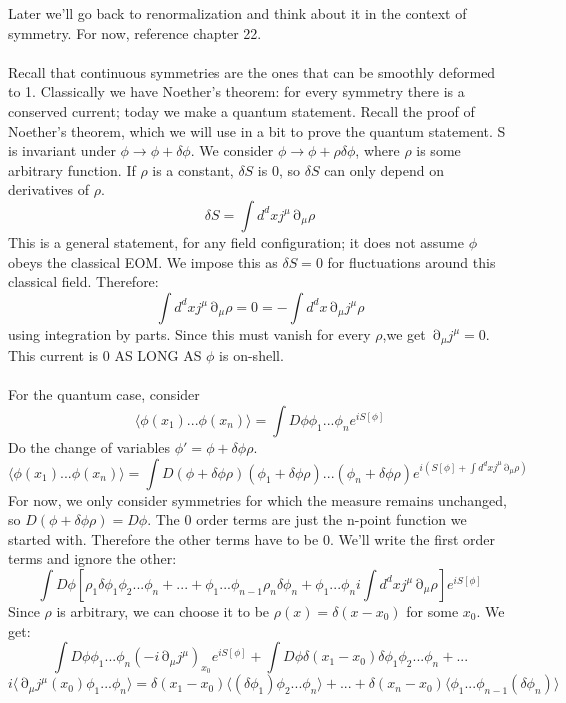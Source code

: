 \documentclass[12 pt]{article}
\DeclareMathOperator {\p} {\partial}
\begin{document}
Later we'll go back to renormalization and think about it in the context of symmetry. For now, reference chapter 22.
\\
\\
Recall that continuous symmetries are the ones that can be smoothly deformed to 1. Classically we have Noether's theorem: for every symmetry there is a conserved current; today we make a quantum statement. Recall the proof of Noether's theorem, which we will use in a bit to prove the quantum statement. S is invariant under $\phi \to \phi+\delta \phi$. We consider $\phi \to \phi + \rho \delta \phi $, where $\rho$ is some arbitrary function. If $\rho$ is a constant, $\delta S$ is 0, so $\delta S$ can only depend on derivatives of $\rho$.
\[      \delta S = \int d^d x j^{\mu} \p_{\mu} \rho        \]
This is a general statement, for any field configuration; it does not assume $\phi$ obeys the classical EOM. We impose this as $\delta S = 0$ for fluctuations around this classical field. Therefore:
\[        \int d^d x j^{\mu} \p_{\mu} \rho   = 0 =  -  \int d^d x  \p_{\mu} j^{\mu}  \rho   \]
using integration by parts. Since this must vanish for every $\rho$,we get $\p_{\mu} j^{\mu} = 0$. This current is 0 AS LONG AS $\phi$ is on-shell.
\\
\\
For the quantum case, consider
\[  \langle \phi(x_1) ... \phi(x_n) \rangle = \int D\phi \phi_1 ... \phi_n e^{iS[\phi]}   \]
Do the change of variables $\phi' = \phi + \delta \phi \rho $.
\[       \langle \phi(x_1) ... \phi(x_n) \rangle = \int D(\phi + \delta\phi \rho) (\phi_1 + \delta \phi \rho) ... (\phi_n + \delta \phi \rho) e^{i(S[\phi]+ \int d^d x j^{\mu} \p_{\mu} \rho)}           \]
For now, we only consider symmetries for which the measure remains unchanged, so $D(\phi + \delta\phi \rho) = D\phi$. The 0 order terms are just the n-point function we started with. Therefore the other terms have to be 0. We'll write the first order terms and ignore the other:
\[        \int D\phi \left[    \rho_1 \delta \phi_1 \phi_2 ... \phi_n  + ... + \phi_1 ... \phi_{n-1} \rho_n \delta \phi_n  + \phi_1 ... \phi_n i \int d^d x j^{\mu} \p_{\mu} \rho   \right]   e^{iS[\phi]}    \]
Since $\rho$ is arbitrary, we can choose it to be $\rho(x) = \delta (x-x_0)$ for some $x_0$. We get:
\[            \int D \phi \phi_1 ... \phi_n (- i \p_{\mu} j^{\mu} )_{x_0} e^{iS[\phi]}  +     \int D\phi \delta(x_1 - x_0) \delta \phi_1 \phi_2 ... \phi_n + ...          \]
\[       i \langle \p_{\mu} j^{\mu}(x_0) \phi_1 ... \phi_n \rangle    =  \delta (x_1 - x_0)  \langle (\delta \phi_1) \phi_2 ... \phi_n \rangle  + ... + \delta (x_n - x_0) \langle \phi_1 ... \phi_{n-1} (\delta \phi_n ) \rangle    \]
\end{document}
